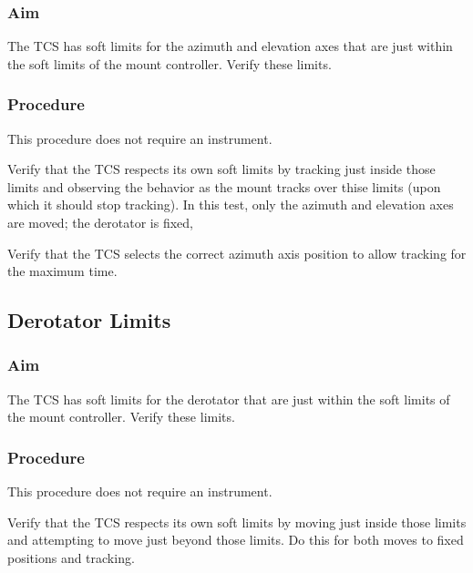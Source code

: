 \documentclass{article}
\begin{document}
\subsubsection{Aim}

The TCS has soft limits for the azimuth and elevation axes that are just within the soft limits of the mount controller. Verify these limits.

\subsubsection{Procedure}

This procedure does not require an instrument.

Verify that the TCS respects its own soft limits by tracking just inside those limits and observing the behavior as the mount tracks over thise limits (upon which it should stop tracking). In this test, only the azimuth and elevation axes are moved; the derotator is fixed,
 
 Verify that the TCS selects the correct azimuth axis position to allow tracking for the maximum time.


\subsection{Derotator Limits}

\subsubsection{Aim}

The TCS has soft limits for the derotator that are just within the soft limits of the mount controller. Verify these limits.

\subsubsection{Procedure}

This procedure does not require an instrument.

Verify that the TCS respects its own soft limits by moving just inside those limits and attempting to move just beyond those limits. Do this for both moves to fixed positions and tracking.

\end{document}
